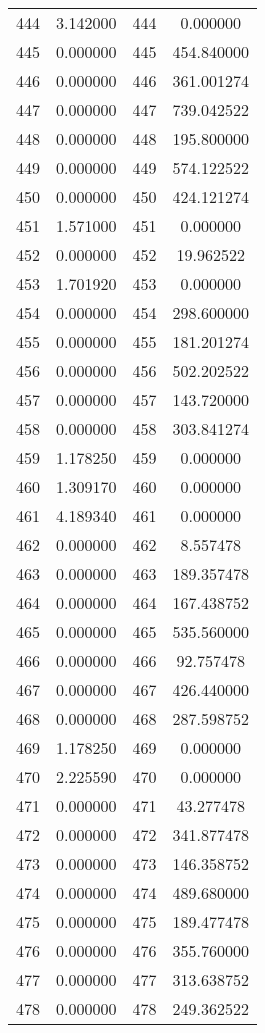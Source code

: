 \documentclass[12pt]{article}
\begin{document}
\begin{longtable}{@{}cccc@{}}
444 & 3.142000 & 444 & 0.000000 \\
445 & 0.000000 & 445 & 454.840000 \\
446 & 0.000000 & 446 & 361.001274 \\
447 & 0.000000 & 447 & 739.042522 \\
448 & 0.000000 & 448 & 195.800000 \\
449 & 0.000000 & 449 & 574.122522 \\
450 & 0.000000 & 450 & 424.121274 \\
451 & 1.571000 & 451 & 0.000000 \\
452 & 0.000000 & 452 & 19.962522 \\
453 & 1.701920 & 453 & 0.000000 \\
454 & 0.000000 & 454 & 298.600000 \\
455 & 0.000000 & 455 & 181.201274 \\
456 & 0.000000 & 456 & 502.202522 \\
457 & 0.000000 & 457 & 143.720000 \\
458 & 0.000000 & 458 & 303.841274 \\
459 & 1.178250 & 459 & 0.000000 \\
460 & 1.309170 & 460 & 0.000000 \\
461 & 4.189340 & 461 & 0.000000 \\
462 & 0.000000 & 462 & 8.557478 \\
463 & 0.000000 & 463 & 189.357478 \\
464 & 0.000000 & 464 & 167.438752 \\
465 & 0.000000 & 465 & 535.560000 \\
466 & 0.000000 & 466 & 92.757478 \\
467 & 0.000000 & 467 & 426.440000 \\
468 & 0.000000 & 468 & 287.598752 \\
469 & 1.178250 & 469 & 0.000000 \\
470 & 2.225590 & 470 & 0.000000 \\
471 & 0.000000 & 471 & 43.277478 \\
472 & 0.000000 & 472 & 341.877478 \\
473 & 0.000000 & 473 & 146.358752 \\
474 & 0.000000 & 474 & 489.680000 \\
475 & 0.000000 & 475 & 189.477478 \\
476 & 0.000000 & 476 & 355.760000 \\
477 & 0.000000 & 477 & 313.638752 \\
478 & 0.000000 & 478 & 249.362522 \\

\end{longtable}
\end{document}
